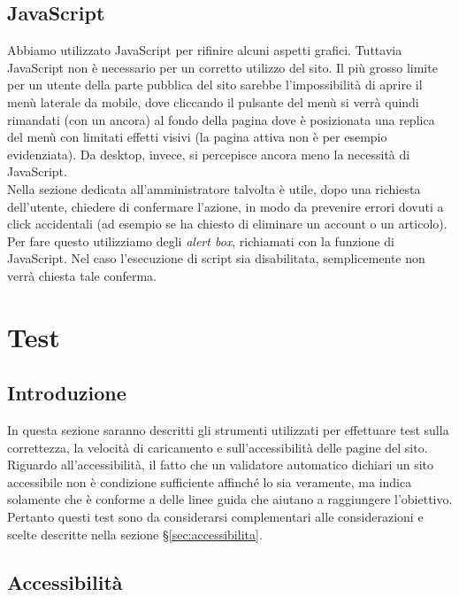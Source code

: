 \documentclass[12pt]{article}
\begin{document}
	\subsection{JavaScript}
	Abbiamo utilizzato JavaScript per rifinire alcuni aspetti grafici. Tuttavia JavaScript non è necessario per un corretto utilizzo del sito. Il più grosso limite per un utente della parte pubblica del sito sarebbe l'impossibilità di aprire il menù laterale da mobile, dove cliccando il pulsante del menù si verrà quindi rimandati (con un ancora) al fondo della pagina dove è posizionata una replica del menù con limitati effetti visivi (la pagina attiva non è per esempio evidenziata). Da desktop, invece, si percepisce ancora meno la necessità di JavaScript.\\ 
	Nella sezione dedicata all'amministratore talvolta è utile, dopo una richiesta dell'utente, chiedere di confermare l'azione, in modo da prevenire errori dovuti a click accidentali (ad esempio se ha chiesto di eliminare un account o un articolo). Per fare questo utilizziamo degli \textit{alert box}, richiamati con la funzione  di JavaScript. Nel caso l'esecuzione di script sia disabilitata, semplicemente non verrà chiesta tale conferma.

	\newpage
	\appendix
	
	\section{Test}
	\subsection{Introduzione}
	In questa sezione saranno descritti gli strumenti utilizzati per effettuare test sulla correttezza, la velocità di caricamento e sull'accessibilità delle pagine del sito. \\Riguardo all'accessibilità, il fatto che un validatore automatico dichiari un sito accessibile non è condizione sufficiente affinché lo sia veramente, ma indica solamente che è conforme a delle linee guida che aiutano a raggiungere l'obiettivo. Pertanto questi test sono da considerarsi complementari alle considerazioni e scelte descritte nella sezione §\ref{sec:accessibilita}.
	
	\subsection{Accessibilità} \label{ssec:testaccessibilita}
	
\end{document}
